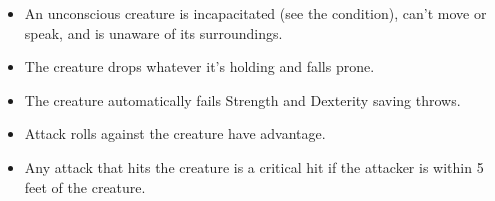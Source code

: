 \documentclass[
]{article}
\providecommand{\tightlist}{%
  \setlength{\itemsep}{0pt}\setlength{\parskip}{0pt}}
\begin{document}
\begin{itemize}
\tightlist
\item
  An unconscious creature is incapacitated (see the condition), can't
  move or speak, and is unaware of its surroundings.
\item
  The creature drops whatever it's holding and falls prone.
\item
  The creature automatically fails Strength and Dexterity saving throws.
\item
  Attack rolls against the creature have advantage.
\item
  Any attack that hits the creature is a critical hit if the attacker is
  within 5 feet of the creature.
\end{itemize}
\end{document}
